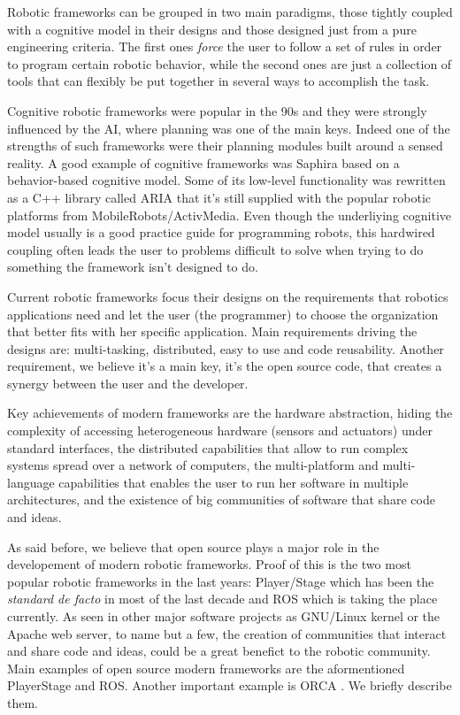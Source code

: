 \documentclass[twocolumn]{svjour3}          %
\begin{document}
Robotic frameworks can be grouped in two main paradigms, those tightly
coupled with a cognitive model in their designs and those designed
just from a pure engineering criteria. The first ones \textit{force}
the user to follow a set of rules in order to program certain robotic
behavior, while the second ones are just a collection of tools that
can flexibly be put together in several ways to accomplish the task.

Cognitive robotic frameworks were popular in the 90s and they were
strongly influenced by the AI, where planning was one of the main
keys. Indeed one of the strengths of such frameworks were their
planning modules built around a sensed reality. A good example of cognitive
frameworks was Saphira \cite{konolige98} based on a behavior-based
cognitive model. Some of its low-level functionality was rewritten as a
C++ library called ARIA \cite{aria} that it's still supplied with the
popular robotic platforms from MobileRobots/ActivMedia. Even though
the underliying cognitive model usually is a good practice guide for
programming robots, this hardwired coupling often leads the user to
problems difficult to solve when trying to do something the framework
isn't designed to do.

Current robotic frameworks focus their designs on the requirements
that robotics applications need and let the user (the programmer) to
choose the organization that better fits with her specific
application. Main requirements driving the designs are: multi-tasking, distributed, easy to
use and code reusability. Another requirement, we believe it's a main
key, it's the open source code, that creates a synergy between the user
and the developer. 

Key achievements of modern frameworks are the hardware abstraction, hiding the complexity of accessing heterogeneous hardware (sensors and
actuators) under standard interfaces, the distributed capabilities
that allow to run complex systems spread over a network of computers,
the multi-platform and multi-language capabilities that enables the
user to run her software in multiple architectures, and the existence
of big communities of software that share code and ideas.

As said before, we believe that open source plays a major role in the
developement of modern robotic frameworks. Proof of this is the two most popular robotic
frameworks in the last years: Player/Stage
\cite{Gerkey03,collet05,vaughan2007} which has been the \textit{standard de
facto} in most of the last decade and ROS \cite{quigley09} which is
taking the place currently. As seen in other major software projects
as GNU/Linux kernel or the Apache web server, to name but a few, the
creation of communities that interact and share code and ideas, could
be a great benefict to the robotic community. Main examples of open
source modern frameworks are the aformentioned PlayerStage and
ROS. Another important example is ORCA \cite{brooks05,brooks07}. We
briefly describe them.
\end{document}
